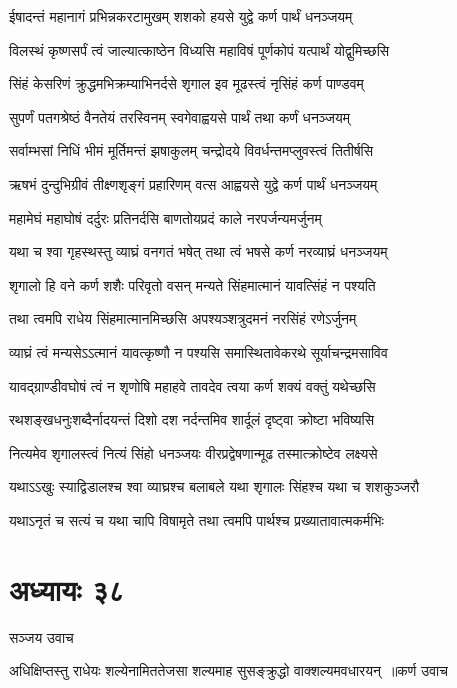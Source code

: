 \twolineshloka
{ईषादन्तं महानागं प्रभिन्नकरटामुखम्}
{शशको हयसे युद्वे कर्ण पार्थं धनञ्जयम्}


\twolineshloka
{विलस्थं कृष्णसर्पं त्वं जाल्यात्काष्ठेन विध्यसि}
{महाविषं पूर्णकोपं यत्पार्थं योद्वुमिच्छसि}


\twolineshloka
{सिंहं केसरिणं क्रुद्धमभिक्रम्याभिनर्दसे}
{शृगाल इव मूढस्त्वं नृसिंहं कर्ण पाण्डवम्}


\twolineshloka
{सुपर्णं पतगश्रेष्ठं वैनतेयं तरस्विनम्}
{स्वगेवाह्वयसे पार्थं तथा कर्णं धनञ्जयम्}


\twolineshloka
{सर्वाम्भसां निधिं भीमं मूर्तिमन्तं झषाकुलम्}
{चन्द्रोदये विवर्धन्तमप्लुवस्त्वं तितीर्षसि}


\twolineshloka
{ऋषभं दुन्दुभिग्रीवं तीक्ष्णशृङ्गं प्रहारिणम्}
{वत्स आह्वयसे युद्वे कर्ण पार्थं धनञ्जयम्}


\twolineshloka
{महामेघं महाघोषं दर्दुरः प्रतिनर्दसि}
{बाणतोयप्रदं काले नरपर्जन्यमर्जुनम्}


\twolineshloka
{यथा च श्वा गृहस्थस्तु व्याघ्रं वनगतं भषेत्}
{तथा त्वं भषसे कर्ण नरव्याघ्रं धनञ्जयम्}


\twolineshloka
{शृगालो हि वने कर्ण शशैः परिवृतो वसन्}
{मन्यते सिंहमात्मानं यावत्सिंहं न पश्यति}


\twolineshloka
{तथा त्वमपि राधेय सिंहमात्मानमिच्छसि}
{अपश्यञ्शत्रुदमनं नरसिंहं रणेऽर्जुनम्}


\twolineshloka
{व्याघ्रं त्वं मन्यसेऽऽत्मानं यावत्कृष्णौ न पश्यसि}
{समास्थितावेकरथे सूर्याचन्द्रमसाविव}


\twolineshloka
{यावद्ग्राण्डीवघोषं त्वं न शृणोषि महाहवे}
{तावदेव त्वया कर्ण शक्यं वक्तुं यथेच्छसि}


\twolineshloka
{रथशङ्खधनुःशब्दैर्नादयन्तं दिशो दश}
{नर्दन्तमिव शार्दूलं दृष्ट्वा क्रोष्टा भविष्यसि}


\twolineshloka
{नित्यमेव शृगालस्त्वं नित्यं सिंहो धनञ्जयः}
{वीरप्रद्वेषणान्मूढ तस्मात्क्रोष्टेव लक्ष्यसे}


\twolineshloka
{यथाऽऽखुः स्याद्विडालश्च श्वा व्याघ्रश्च बलाबले}
{यथा शृगालः सिंहश्च यथा च शशकुञ्जरौ}


\twolineshloka
{यथाऽनृतं च सत्यं च यथा चापि विषामृते}
{तथा त्वमपि पार्थश्च प्रख्यातावात्मकर्मभिः}


\chapter{अध्यायः ३८}
\twolineshloka
{सञ्जय उवाच}
{}


\threelineshloka
{अधिक्षिप्तस्तु राधेयः शल्येनामिततेजसा}
{शल्यमाह सुसङ्क्रुद्धो वाक्शल्यमवधारयन् ॥कर्ण उवाच}
{}


